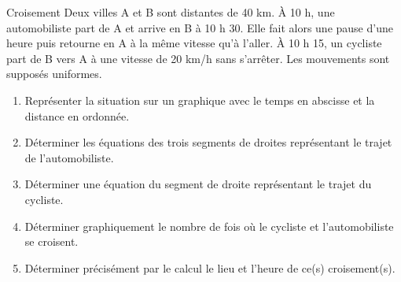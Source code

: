 \documentclass{beamer}
\begin{document}
\begin{frame}{Croisement}
Deux villes A et B sont distantes de 40 km. À 10 h, une automobiliste part de A et arrive en B à 10 h 30. Elle fait alors une pause d’une heure puis retourne en A à la même vitesse qu’à l’aller. À 10 h 15, un cycliste part de B vers A à une vitesse de 20 km/h sans s’arrêter. Les mouvements sont supposés uniformes.

\begin{enumerate}
    \item Représenter la situation sur un graphique avec le temps en abscisse et la distance en ordonnée.
    \item Déterminer les équations des trois segments de droites représentant le trajet de l’automobiliste.
    \item Déterminer une équation du segment de droite représentant le trajet du cycliste.
    \item Déterminer graphiquement le nombre de fois où le cycliste et l’automobiliste se croisent.
    \item Déterminer précisément par le calcul le lieu et l’heure de ce(s) croisement(s).
\end{enumerate}
\end{frame}
\end{document}
